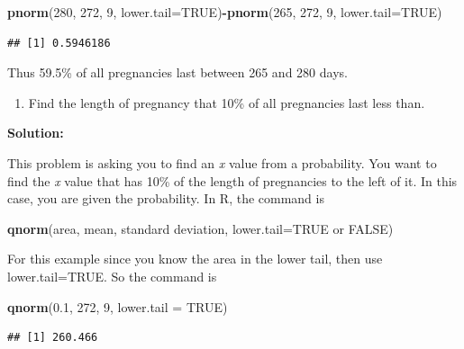 \documentclass[
]{book}
\newenvironment{Shaded}{\begin{snugshade}}{\end{snugshade}}
\newcommand{\DataTypeTok}[1]{\textcolor[rgb]{0.13,0.29,0.53}{#1}}
\newcommand{\DecValTok}[1]{\textcolor[rgb]{0.00,0.00,0.81}{#1}}
\newcommand{\FloatTok}[1]{\textcolor[rgb]{0.00,0.00,0.81}{#1}}
\newcommand{\KeywordTok}[1]{\textcolor[rgb]{0.13,0.29,0.53}{\textbf{#1}}}
\newcommand{\NormalTok}[1]{#1}
\newcommand{\OperatorTok}[1]{\textcolor[rgb]{0.81,0.36,0.00}{\textbf{#1}}}
\newcommand{\OtherTok}[1]{\textcolor[rgb]{0.56,0.35,0.01}{#1}}
\providecommand{\tightlist}{%
  \setlength{\itemsep}{0pt}\setlength{\parskip}{0pt}}
\begin{document}
\begin{Shaded}
\begin{Highlighting}[]
\KeywordTok{pnorm}\NormalTok{(}\DecValTok{280}\NormalTok{, }\DecValTok{272}\NormalTok{, }\DecValTok{9}\NormalTok{, }\DataTypeTok{lower.tail=}\OtherTok{TRUE}\NormalTok{)}\OperatorTok{-}\KeywordTok{pnorm}\NormalTok{(}\DecValTok{265}\NormalTok{, }\DecValTok{272}\NormalTok{, }\DecValTok{9}\NormalTok{, }\DataTypeTok{lower.tail=}\OtherTok{TRUE}\NormalTok{)}
\end{Highlighting}
\end{Shaded}

\begin{verbatim}
## [1] 0.5946186
\end{verbatim}

Thus 59.5\% of all pregnancies last between 265 and 280 days.

\begin{enumerate}
\def\labelenumi{\alph{enumi}.}
\setcounter{enumi}{4}
\tightlist
\item
  Find the length of pregnancy that 10\% of all pregnancies last less than.
\end{enumerate}

\textbf{Solution:}

This problem is asking you to find an \emph{x} value from a probability. You want to find the \emph{x} value that has 10\% of the length of pregnancies to the left of it. In this case, you are given the probability. In R, the command is

\begin{Shaded}
\begin{Highlighting}[]
\KeywordTok{qnorm}\NormalTok{(area, mean, standard deviation, }\DataTypeTok{lower.tail=}\OtherTok{TRUE}\NormalTok{ or }\OtherTok{FALSE}\NormalTok{)}
\end{Highlighting}
\end{Shaded}

For this example since you know the area in the lower tail, then use lower.tail=TRUE. So the command is

\begin{Shaded}
\begin{Highlighting}[]
\KeywordTok{qnorm}\NormalTok{(}\FloatTok{0.1}\NormalTok{, }\DecValTok{272}\NormalTok{, }\DecValTok{9}\NormalTok{, }\DataTypeTok{lower.tail =} \OtherTok{TRUE}\NormalTok{)}
\end{Highlighting}
\end{Shaded}

\begin{verbatim}
## [1] 260.466
\end{verbatim}
\end{document}
